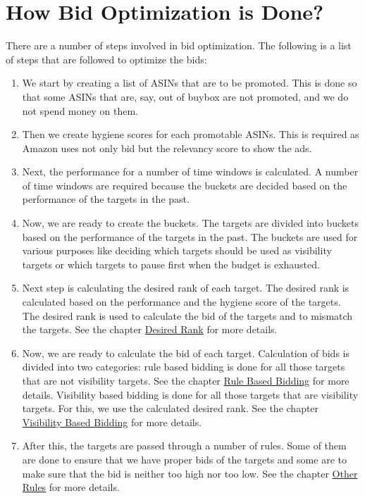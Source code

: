 \section{How Bid Optimization is Done?}

There are a number of steps involved in bid optimization. The following is a list of steps that are followed to optimize the bids:

\begin{enumerate}
    \item We start by creating a list of ASINs that are to be promoted. This is done so that some ASINs that are, say, out of buybox are not promoted, and we do not spend money on them.
    \item Then we create hygiene scores for each promotable ASINs. This is required as Amazon uses not only bid but the relevancy score to show the ads.
    \item Next, the performance for a number of time windows is calculated. A number of time windows are required because the buckets are decided based on the performance of the targets in the past.
    \item Now, we are ready to create the buckets. The targets are divided into buckets based on the performance of the targets in the past. The buckets are used for various purposes like deciding which targets should be used as visibility targets or which targets to pause first when the budget is exhausted.
    \item Next step is calculating the desired rank of each target. The desired rank is calculated based on the performance and the hygiene score of the targets. The desired rank is used to calculate the bid of the targets and to mismatch the targets. See the chapter \hyperref[ch:desired_rank]{Desired Rank} for more details.
    \item Now, we are ready to calculate the bid of each target. Calculation of bids is divided into two categories: rule based bidding is done for all those targets that are not visibility targets. See the chapter \hyperref[ch:rule_based_bids]{Rule Based Bidding} for more details. Visibility based bidding is done for all those targets that are visibility targets. For this, we use the calculated desired rank. See the chapter \hyperref[ch:visibility_bids]{Visibility Based Bidding} for more details.
    \item After this, the targets are passed through a number of rules. Some of them are done to ensure that we have proper bids of the targets and some are to make sure that the bid is neither too high nor too low. See the chapter \hyperref[ch:other_rules]{Other Rules} for more details.
\end{enumerate}

